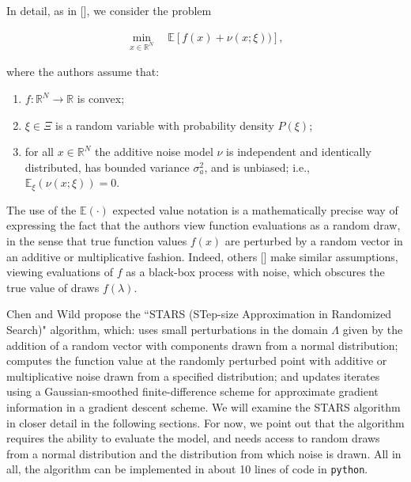 \documentclass{amsart}
\newcommand{\R}{\mathbb{R}}
\begin{document}
In detail, as in [], we consider the problem

\begin{eqnarray} \label{eq:11}
\min_{x\in\R^N} \quad \mathbb{E}\left[f(x)+\nu (x; \xi))\right],
\end{eqnarray} 

\noindent where the authors assume that:

\begin{enumerate}[(i.)]

\item $f: \R^N \to \R$ is convex;

\item $\xi \in \Xi$ is a random variable with probability density $P(\xi)$;

\item for all $x \in \R^N$ the additive noise model $\nu$ is independent and identically distributed, has bounded variance $\sigma_a^2$, and is unbiased; i.e., $\mathbb{E}_\xi (\nu(x;\xi))=0$.



\end{enumerate}

The use of the $\mathbb{E}(\cdot)$ expected value notation is a mathematically precise way of expressing the fact that the authors view function evaluations as a random draw, in the sense that true function values $f(x)$ are perturbed by a random vector in an additive or multiplicative fashion. Indeed, others [] make similar assumptions, viewing evaluations of $f$ as a black-box process with noise, which obscures the true value of draws $f(\lambda)$.

Chen and Wild propose the ``STARS (STep-size Approximation in Randomized Search)" algorithm, which: uses small perturbations in the domain $\Lambda$ given by the addition of a random vector with components drawn from a normal distribution; computes the function value at the randomly perturbed point with additive or multiplicative noise drawn from a specified distribution; and updates iterates using a Gaussian-smoothed finite-difference scheme for approximate gradient information in a gradient descent scheme. We will examine the STARS algorithm in closer detail in the following sections. For now, we point out that the algorithm requires the ability to evaluate the model, and needs access to random draws from a normal distribution and the distribution from which noise is drawn. All in all, the algorithm can be implemented in about 10 lines of code in \texttt{python}.
\end{document}
